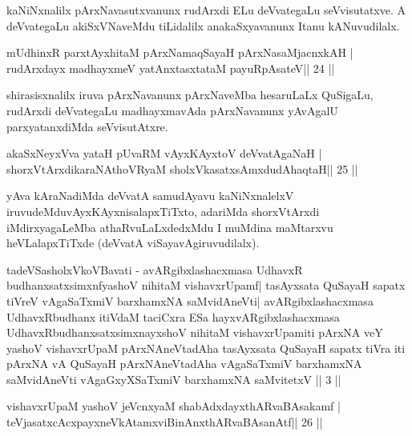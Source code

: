 \begin{artha}
kaNiNxnalilx pArxNavasutxvanunx rudArxdi ELu deVvategaLu seVvisutatxve. A deVvategaLu akiSxVNaveMdu tiLidalilx anakaSxyavanunx Itanu kANuvudilalx.
\end{artha}

\begin{shl}
mUdhinxR parxtAyxhitaM pArxNamaqSayaH pArxNasaMjacnxkAH |
rudArxdayx madhayxmeV yatAnxtasxtataM payuRpAsateV\hfill || 24 ||
\end{shl}

\begin{artha}
shirasisxnalilx iruva pArxNavanunx pArxNaveMba hesaruLaLx QuSigaLu, rudArxdi deVvategaLu madhayxmavAda pArxNavanunx yAvAgalU parxyatanxdiMda seVvisutAtxre.
\end{artha}

\begin{shl}
akaSxNeyxVva yataH pUvaRM vAyxKAyxtoV deVvatAgaNaH |
shorxVtArxdikaraNAthoVR\s yaM sholxVkasatxsAmxdudAhaqtaH\hfill || 25 ||
\end{shl}

\begin{artha}
yAva kAraNadiMda deVvatA samudAyavu kaNiNxnalelxV iruvudeMdu\break vAyxKAyxnisalapxTiTxto, adariMda shorxVtArxdi iMdirxyagaLeMba athaRvuLaLxdedxMdu I muMdina maMtarxvu heVLalapxTiTxde (deVvatA viSayavAgiruvudilalx).
\end{artha}




\begin{kandikeshl}
tadeVSasholxVkoVBavati - avARgibxlashacxmasa UdhavxR budhanx\break satxsimxnfyashoV  nihitaM vishavxrUpamf| tasAyx\s\s sata QuSayaH sapatx tiVreV vAgaSaTxmiV barxhamxNA saMvidAneVti|  avARgibxlashacxmasa UdhavxRbudhanx itiVdaM taciCxra ESa hayxvARgibxlashacxmasa UdhavxRbudhanxsatxsimxnayxshoV nihitaM vishavxrUpamiti pArxNA veY yashoV vishavxrUpaM \-pArxNAneVtadAha tasAyxsata QuSayaH sapatx tiVra iti pArxNA vA QuSayaH pArxNAneVtadAha vAgaSaTxmiV barxhamxNA saMvidAneVti vAgaGxyXSaTxmiV barxhamxNA saMvitetxV || 3 ||
\end{kandikeshl}

\begin{shl}
vishavxrUpaM yashoV jeVcnxyaM shabAdxdayxthARvaBAsakamf |
teVjasatxcAcxpayxneVkAtamxviBinAnxthARvaBAsanAtf\hfill || 26 ||
\end{shl}

